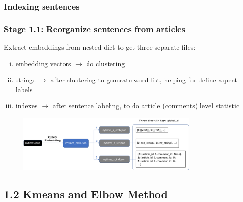 \documentclass{tum-presentation}
\begin{document}
\subsubsection{Indexing sentences}
\begin{frame}
  
  \frametitle{Stage 1.1: Reorganize sentences from articles }
  \large
  \begin{description}
    \item Extract embeddings from nested dict to get three separate files:
    \begin{enumerate}[(i)]
      \item  embedding vectors $\to$ do clustering
      \item  strings $\to$ after clustering to generate word list, helping for define aspect labels
      \item  indexes $\to$ after sentence labeling, to do article (comments) level statistic
      \end{enumerate}
    \begin{figure}[t]
    \includegraphics[width = 0.8\textwidth]{figures/diagram.pdf}
    \end{figure}
  \end{description}
\end{frame}



\subsection{1.2 Kmeans and Elbow Method}
\end{document}
